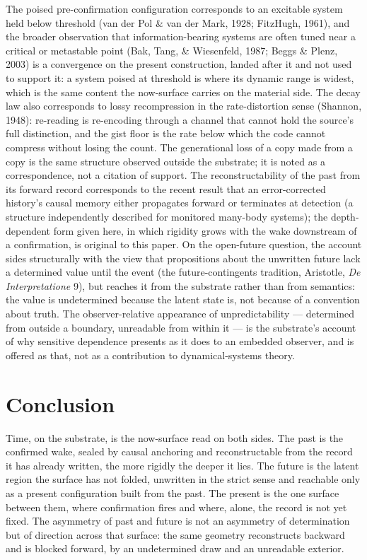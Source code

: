 \documentclass[11pt,oneside]{report}
\theoremstyle{definition}
\theoremstyle{remark}
\begin{document}
The poised pre-confirmation configuration corresponds to an excitable
system held below threshold (van der Pol \& van der Mark, 1928; FitzHugh,
1961), and the broader observation that information-bearing systems are
often tuned near a critical or metastable point (Bak, Tang, \&
Wiesenfeld, 1987; Beggs \& Plenz, 2003) is a convergence on the present
construction, landed after it and not used to support it: a system poised
at threshold is where its dynamic range is widest, which is the same
content the now-surface carries on the material side. The decay law also
corresponds to lossy recompression in the rate-distortion sense (Shannon,
1948): re-reading is re-encoding through a channel that cannot hold the
source's full distinction, and the gist floor is the rate below which the
code cannot compress without losing the count. The generational loss of a
copy made from a copy is the same structure observed outside the
substrate; it is noted as a correspondence, not a citation of support. The
reconstructability of the past from its forward record corresponds to the
recent result that an error-corrected history's causal memory either
propagates forward or terminates at detection (a structure independently
described for monitored many-body systems); the depth-dependent form given
here, in which rigidity grows with the wake downstream of a confirmation,
is original to this paper. On the open-future question, the account sides
structurally with the view that propositions about the unwritten future
lack a determined value until the event (the future-contingents tradition,
Aristotle, \emph{De Interpretatione} 9), but reaches it from the substrate
rather than from semantics: the value is undetermined because the latent
state is, not because of a convention about truth. The observer-relative
appearance of unpredictability --- determined from outside a boundary,
unreadable from within it --- is the substrate's account of why sensitive
dependence presents as it does to an embedded observer, and is offered as
that, not as a contribution to dynamical-systems theory.

\section*{Conclusion}

Time, on the substrate, is the now-surface read on both sides. The past is
the confirmed wake, sealed by causal anchoring and reconstructable from
the record it has already written, the more rigidly the deeper it lies.
The future is the latent region the surface has not folded, unwritten in
the strict sense and reachable only as a present configuration built from
the past. The present is the one surface between them, where confirmation
fires and where, alone, the record is not yet fixed. The asymmetry of past
and future is not an asymmetry of determination but of direction across
that surface: the same geometry reconstructs backward and is blocked
forward, by an undetermined draw and an unreadable exterior.
\end{document}
